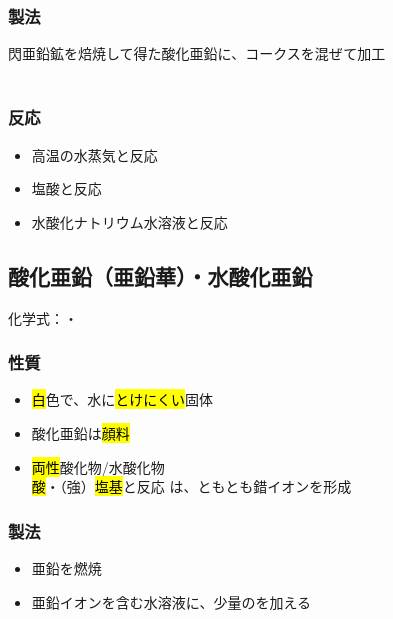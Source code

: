 \subsubsection{製法}
閃亜鉛鉱を焙焼して得た酸化亜鉛に、コークスを混ぜて加工 \K\\
\\
\subsubsection{反応}
\begin{itemize}
  \item 高温の水蒸気と反応 \\
  \item 塩酸と反応 \\
  \item 水酸化ナトリウム水溶液と反応 \\
\end{itemize}
\twocolumn
\newpage
\subsection{酸化亜鉛（亜鉛華）・水酸化亜鉛}
化学式：\hl{}・\hl{}
\subsubsection{性質}
\begin{itemize}
  \item \hl{白}色で、水に\hl{とけにくい}固体
  \item 酸化亜鉛は\hl{顔料}
  \item \hl{両性}酸化物/水酸化物\\
        \hl{酸}・（強）\hl{塩基}と反応
        は、\hl{}とも\hl{}とも錯イオンを形成
\end{itemize}
\subsubsection{製法}
\begin{itemize}
  \item 亜鉛を燃焼  \K\\
  \item 亜鉛イオンを含む水溶液に、少量の\hl{}を加える \\
\end{itemize}
